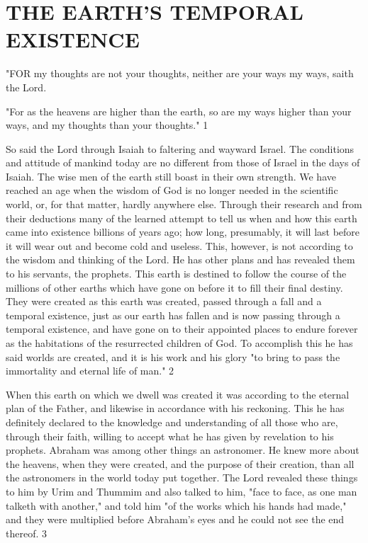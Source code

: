 \chapter{THE EARTH'S TEMPORAL EXISTENCE}

"FOR my thoughts are not your thoughts, neither are your ways my ways, saith the Lord.

"For as the heavens are higher than the earth, so are my ways higher than your ways, and my
thoughts than your thoughts." 1

So said the Lord through Isaiah to faltering and wayward Israel. The conditions and attitude
of mankind today are no different from those of Israel in the days of Isaiah. The wise men of
the earth still boast in their own strength. We have reached an age when the wisdom of God
is no longer needed in the scientific world, or, for that matter, hardly anywhere else. Through
their research and from their deductions many of the learned attempt to tell us when and how
this earth came into existence billions of years ago; how long, presumably, it will last before
it will wear out and become cold and useless. This, however, is not according to the wisdom
and thinking of the Lord. He has other plans and has revealed them to his servants, the
prophets. This earth is destined to follow the course of the millions of other earths which
have gone on before it to fill their final destiny. They were created as this earth was created,
passed through a fall and a temporal existence, just as our earth has fallen and is now passing
through a temporal existence, and have gone on to their appointed places to endure forever as
the habitations of the resurrected children of God. To accomplish this he has said worlds are
created, and it is his work and his glory "to bring to pass the immortality and eternal life of
man." 2

When this earth on which we dwell was created it was according to the eternal plan of the
Father, and likewise in accordance with his reckoning. This he has definitely declared to the
knowledge and understanding of all those who are, through their faith, willing to accept what
he has given by revelation to his prophets. Abraham was among other things an astronomer.
He knew more about the heavens, when they were created, and the purpose of their creation,
than all the astronomers in the world today put together. The Lord revealed these things to
him by Urim and Thummim and also talked to him, "face to face, as one man talketh with
another," and told him "of the works which his hands had made," and they were multiplied
before Abraham's eyes and he could not see the end thereof. 3

